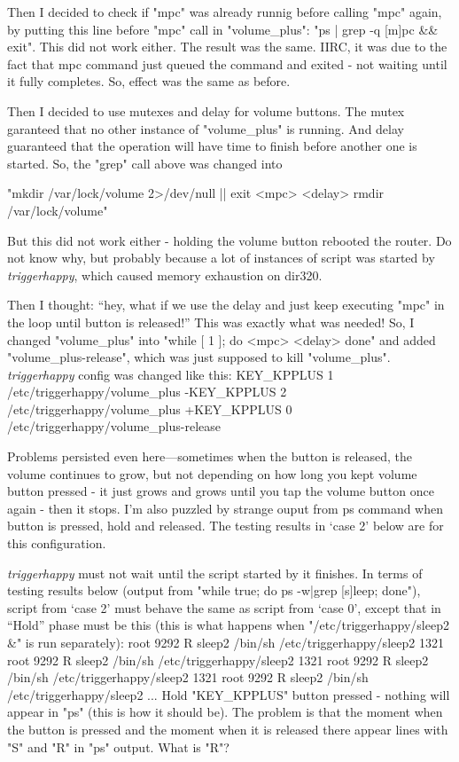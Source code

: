Then I decided to check if "mpc" was already runnig before calling "mpc"
again, by putting this line before "mpc" call in "volume_plus":
"ps | grep -q [m]pc && exit". This did not work either. The result was
the same. IIRC, it was due to the fact that mpc command just queued the
command and exited - not waiting until it fully completes. So, effect
was the same as before.

Then I decided to use mutexes and delay for volume buttons.
The mutex garanteed that no other instance of "volume_plus" is running.
And delay guaranteed that the operation will have time to finish before
another one is started. So, the "grep" call above was changed into \par
"mkdir /var/lock/volume 2>/dev/null || exit <mpc> <delay>
rmdir /var/lock/volume" \par\noindent But this did not work either - holding the
volume button rebooted the router. Do not know why, but probably because
a lot of instances of script was started by {\sl triggerhappy\/}, which
caused memory exhaustion on dir320.

Then I thought: ``hey, what if we use the delay and just keep executing
"mpc" in the loop until button is released!'' This was exactly what
was needed! So, I changed "volume_plus" into "while [ 1 ]; do <mpc>
<delay> done" and added "volume_plus-release", which was just supposed
to kill "volume_plus". {\sl triggerhappy\/} config was changed like this:
\begtt
 KEY_KPPLUS 1 /etc/triggerhappy/volume_plus
-KEY_KPPLUS 2 /etc/triggerhappy/volume_plus
+KEY_KPPLUS 0 /etc/triggerhappy/volume_plus-release
\endtt

Problems persisted even here---sometimes when the button is released,
the volume continues to grow, but not depending on how long you kept
volume button pressed - it just grows and grows until you tap the
volume button once again - then it stops. I'm also puzzled by strange
ouput from ps command when button is pressed, hold and released.
The testing results in `case 2' below are for this configuration.

{\sl triggerhappy\/} must not wait until the script started by it finishes.
In terms of testing results below (output from
"while true; do ps -w|grep [s]leep; done"), script from `case 2' must behave
the same as script from `case 0', except
that in ``Hold'' phase must be this
(this is what happens when "/etc/triggerhappy/sleep2 &" is run separately):
 root      9292 R    {sleep2} /bin/sh /etc/triggerhappy/sleep2
 1321 root      9292 R    {sleep2} /bin/sh /etc/triggerhappy/sleep2
 1321 root      9292 R    {sleep2} /bin/sh /etc/triggerhappy/sleep2
 1321 root      9292 R    {sleep2} /bin/sh /etc/triggerhappy/sleep2
...
\endtt
\medskip
{}
Hold "KEY_KPPLUS"
button pressed - nothing will appear in "ps" (this is how it should be).
The problem is that the moment when the button is pressed and the
moment when it is released there appear lines with "S" and "R" in
"ps" output. What is "R"?

